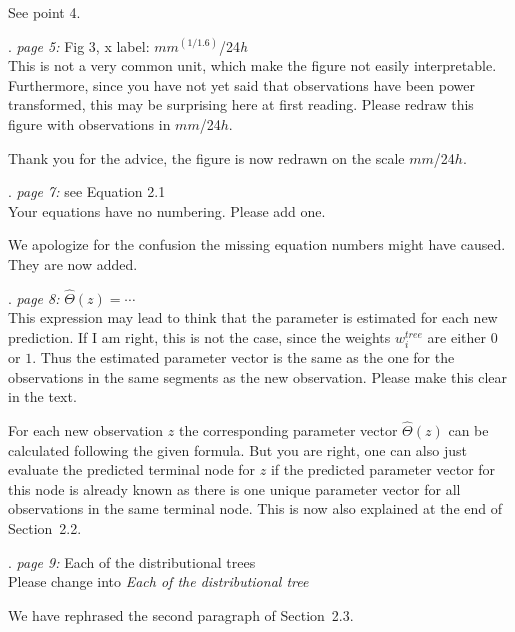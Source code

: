 \documentclass[american,foldmarks=false,noconfig]{uibklttr}
\newenvironment{review}{\fontshape{\itdefault}\fontseries{\bfdefault} \selectfont \smallskip}{\par}
\begin{document}
See point 4.

\begin{review}
6. {\color{quotecolor}\textit{page 5:} Fig 3, x label: $mm^{(1/1.6)}$/24\textit{h}}\\
This is not a very common unit, which make the figure not easily 
interpretable. Furthermore, since you have not yet said that 
observations have been power transformed, this may be surprising 
here at first reading. Please redraw this figure with 
observations in $mm$/24$h$.
\end{review}

Thank you for the advice, the figure is now redrawn on the scale $mm$/24$h$.


\begin{review}
7. {\color{quotecolor}\textit{page 7:} see Equation 2.1}\\
Your equations have no numbering. Please add one.
\end{review}

We apologize for the confusion the missing equation numbers 
might have caused. They are now added.

\begin{review}
8. {\color{quotecolor}\textit{page 8:} $\hat{\Theta}(z) = \cdots$}\\
This expression may lead to think that the parameter is estimated 
for each new prediction. If I am right, this is not the case, 
since the weights $w_i^{tree}$ are either $0$ or $1$. Thus the 
estimated parameter vector is the same as the one for the 
observations in the same segments as the new observation.
Please make this clear in the text.
\end{review}

For each new observation $z$ the corresponding 
parameter vector $\hat{\Theta}(z)$ can be calculated following 
the given formula. But you are right, one can also just evaluate 
the predicted terminal node for $z$ if the predicted parameter
vector for this node is already known as there is one unique 
parameter vector for all observations in the same terminal node.
This is now also explained at the end of Section~2.2.


\begin{review}
9. {\color{quotecolor}\textit{page 9:} Each of the distributional trees}\\
Please change into \textit{Each of the distributional tree}
\end{review}

We have rephrased the second paragraph of Section~2.3.
\end{document}
